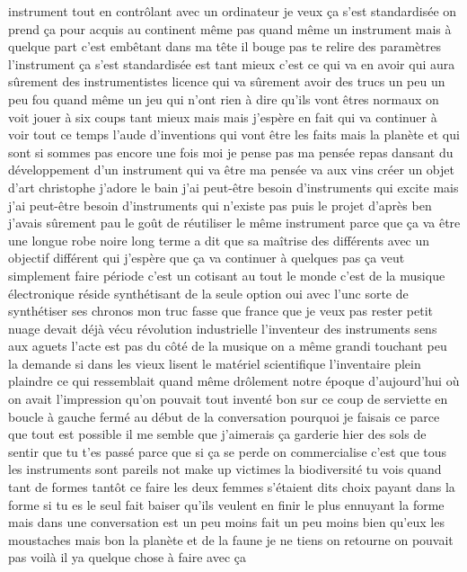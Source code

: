 instrument tout en contrôlant avec un ordinateur je veux ça s'est standardisée on prend ça pour acquis au continent même pas quand même un instrument mais à quelque part c'est embêtant dans ma tête il bouge pas te relire des paramètres l'instrument ça s'est standardisée est tant mieux c'est ce qui va en avoir qui aura sûrement des instrumentistes licence qui va sûrement avoir des trucs un peu un peu fou quand même un jeu qui n'ont rien à dire qu'ils vont êtres normaux on voit jouer à six coups tant mieux mais mais j'espère en fait qui va continuer à voir tout ce temps l'aude d'inventions qui vont être les faits mais la planète et qui sont si sommes pas encore une fois moi je pense pas ma pensée repas dansant du développement d'un instrument qui va être ma pensée va aux vins créer un objet d'art christophe j'adore le bain j'ai peut-être besoin d'instruments qui excite mais j'ai peut-être besoin d'instruments qui n'existe pas puis le projet d'après ben j'avais sûrement pau le goût de réutiliser le même instrument parce que ça va être une longue robe noire long terme a dit que sa maîtrise des différents avec un objectif différent qui j'espère que ça va continuer à quelques pas ça veut simplement faire période c'est un cotisant au tout le monde c'est de la musique électronique réside synthétisant de la seule option oui avec l'unc sorte de synthétiser ses chronos mon truc fasse que france que je veux pas rester petit nuage devait déjà vécu révolution industrielle l'inventeur des instruments sens aux aguets l'acte est pas du côté de la musique on a même grandi touchant peu la demande si dans les vieux lisent le matériel scientifique l'inventaire plein plaindre ce qui ressemblait quand même drôlement notre époque d'aujourd'hui où on avait l'impression qu'on pouvait tout inventé bon sur ce coup de serviette en boucle à gauche fermé au début de la conversation pourquoi je faisais ce parce que tout est possible il me semble que j'aimerais ça garderie hier des sols de sentir que tu t'es passé parce que si ça se perde on commercialise c'est que tous les instruments sont pareils not make up victimes la biodiversité tu vois quand tant de formes tantôt ce faire les deux femmes s'étaient dits choix payant dans la forme si tu es le seul fait baiser qu'ils veulent en finir le plus ennuyant la forme mais dans une conversation est un peu moins fait un peu moins bien qu'eux les moustaches mais bon la planète et de la faune je ne tiens on retourne on pouvait pas voilà il ya quelque chose à faire avec ça



